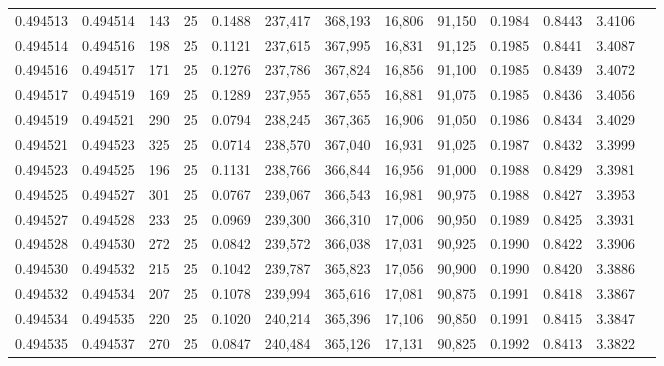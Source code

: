 \begin{tabular}{rrrrrrrrrrrrr}
0.494513 & 0.494514 &   143 &  25 &                                     0.1488 & 237,417 & 368,193 &  16,806 &  91,150 & 0.1984 & 0.8443 & 3.4106 \\
0.494514 & 0.494516 &   198 &  25 &                                     0.1121 & 237,615 & 367,995 &  16,831 &  91,125 & 0.1985 & 0.8441 & 3.4087 \\
0.494516 & 0.494517 &   171 &  25 &                                     0.1276 & 237,786 & 367,824 &  16,856 &  91,100 & 0.1985 & 0.8439 & 3.4072 \\
0.494517 & 0.494519 &   169 &  25 &                                     0.1289 & 237,955 & 367,655 &  16,881 &  91,075 & 0.1985 & 0.8436 & 3.4056 \\
0.494519 & 0.494521 &   290 &  25 &                                     0.0794 & 238,245 & 367,365 &  16,906 &  91,050 & 0.1986 & 0.8434 & 3.4029 \\
0.494521 & 0.494523 &   325 &  25 &                                     0.0714 & 238,570 & 367,040 &  16,931 &  91,025 & 0.1987 & 0.8432 & 3.3999 \\
0.494523 & 0.494525 &   196 &  25 &                                     0.1131 & 238,766 & 366,844 &  16,956 &  91,000 & 0.1988 & 0.8429 & 3.3981 \\
0.494525 & 0.494527 &   301 &  25 &                                     0.0767 & 239,067 & 366,543 &  16,981 &  90,975 & 0.1988 & 0.8427 & 3.3953 \\
0.494527 & 0.494528 &   233 &  25 &                                     0.0969 & 239,300 & 366,310 &  17,006 &  90,950 & 0.1989 & 0.8425 & 3.3931 \\
0.494528 & 0.494530 &   272 &  25 &                                     0.0842 & 239,572 & 366,038 &  17,031 &  90,925 & 0.1990 & 0.8422 & 3.3906 \\
0.494530 & 0.494532 &   215 &  25 &                                     0.1042 & 239,787 & 365,823 &  17,056 &  90,900 & 0.1990 & 0.8420 & 3.3886 \\
0.494532 & 0.494534 &   207 &  25 &                                     0.1078 & 239,994 & 365,616 &  17,081 &  90,875 & 0.1991 & 0.8418 & 3.3867 \\
0.494534 & 0.494535 &   220 &  25 &                                     0.1020 & 240,214 & 365,396 &  17,106 &  90,850 & 0.1991 & 0.8415 & 3.3847 \\
0.494535 & 0.494537 &   270 &  25 &                                     0.0847 & 240,484 & 365,126 &  17,131 &  90,825 & 0.1992 & 0.8413 & 3.3822 \\

\end{tabular}
